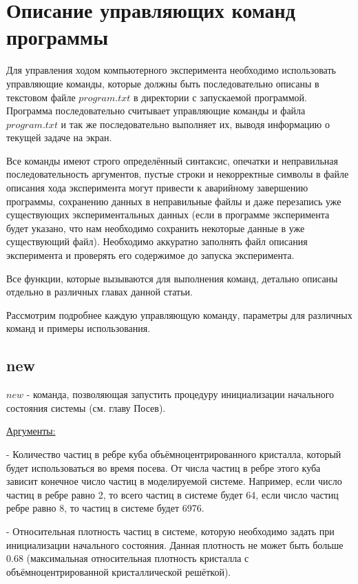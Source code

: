 \documentclass{article}
\begin{document}
\newpage
\section{Описание управляющих команд программы}
Для управления ходом компьютерного эксперимента необходимо использовать управляющие команды, которые должны быть последовательно описаны в текстовом файле $ program.txt $ в директории с запускаемой программой. Программа последовательно считывает управляющие команды и файла $ program.txt $ и так же последовательно выполняет их, выводя информацию о текущей задаче на экран.

Все команды имеют строго определённый синтаксис, опечатки и неправильная последовательность аргументов, пустые строки и некорректные символы в файле описания хода эксперимента могут привести
к аварийному завершению программы, сохранению данных в неправильные файлы и даже перезапись уже существующих экспериментальных данных (если в программе эксперимента будет указано, что нам необходимо сохранить некоторые данные в уже существующий файл). Необходимо аккуратно заполнять файл описания эксперимента и проверять его содержимое до запуска эксперимента.

Все функции, которые вызываются для выполнения команд, детально описаны отдельно в различных главах данной статьи.

Рассмотрим подробнее каждую управляющую команду, параметры для различных команд и примеры использования.

\subsection{new}
$ new $ - команда, позволяющая запустить процедуру инициализации начального состояния системы (см. главу Посев). 

\uline{Аргументы:}

- Количество частиц в ребре куба объёмноцентрированного кристалла, который будет использоваться во время посева. От числа частиц в ребре этого куба зависит конечное число частиц в моделируемой системе. Например, если число частиц в ребре равно 2, то всего частиц в системе будет 64, если число частиц ребре равно 8, то частиц в системе будет 6976.

- Относительная плотность частиц в системе, которую необходимо задать при инициализации начального состояния. Данная плотность не может быть больше 0.68 (максимальная относительная плотность кристалла с объёмноцентрированной кристаллической решёткой).
\end{document}
